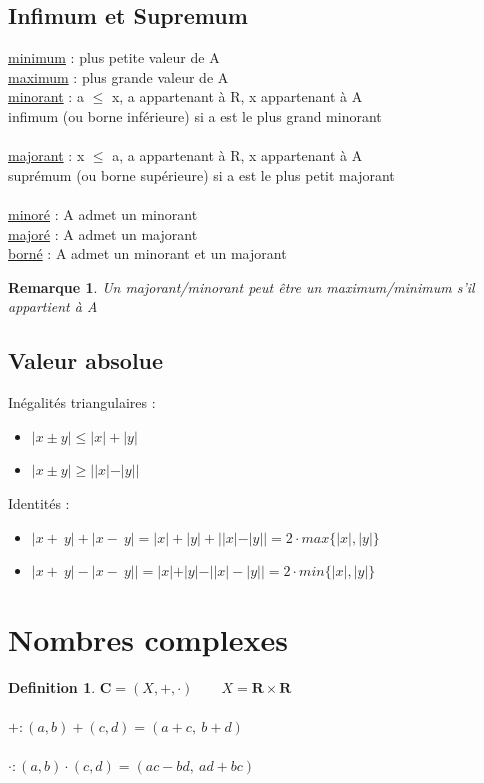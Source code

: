 \documentclass{article}
\newtheorem{definition}{Definition}[section]
\newtheorem{remark}{Remarque}[section]
\begin{document}
\subsection{Infimum et Supremum}
\underline{minimum} : plus petite valeur de A \\
\underline{maximum} : plus grande valeur de A \\
\underline{minorant} : a \(\leq\) x, a appartenant à R, x appartenant à A \\ infimum (ou borne inférieure) si a est le plus grand minorant \\\\
\underline{majorant} : x \(\leq\) a, a appartenant à R, x appartenant à A  \\ suprémum (ou borne supérieure) si a est le plus petit majorant\\\\
\underline{minoré} : A admet un minorant \\
\underline{majoré} : A admet un majorant \\
\underline{borné} : A admet un minorant et un majorant
\begin{remark}
    Un majorant/minorant peut être un maximum/minimum s'il appartient à A
\end{remark}
\subsection{Valeur absolue}
Inégalités triangulaires :
\begin{itemize}
    \item \( |x \pm y| \leq |x| + |y| \)
    \item \( |x \pm y| \geq ||x| - |y|| \)
\end{itemize}
Identités :
\begin{itemize}
    \item \( |x +\ y| + |x -\ y| =  |x| + |y| + ||x| - |y|| = 2 \cdot max\{|x|, |y|\}\)
    \item \( |x +\ y| - |x -\ y|| =  |x| + |y| - ||x| - |y|| = 2 \cdot min\{|x|, |y|\}\)
\end{itemize}
\section{Nombres complexes}
\begin{definition}
   \( \mathbf{C} = (X, +, \cdot) \qquad X = \mathbf{R} \times \mathbf{R} \)\\\\
   \( + : (a, b) + (c, d) = (a + c,\ b + d)\) \\\\
   \( \cdot : (a, b) \cdot (c, d) = (ac - bd,\ ad + bc) \)
\end{definition} \newpage
\end{document}
